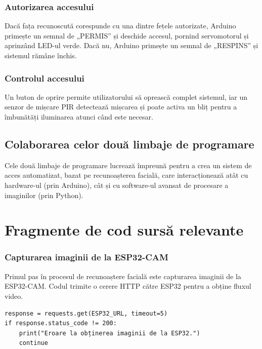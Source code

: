 \documentclass[a4paper,12pt]{report}
\begin{document}
\subsection{Autorizarea accesului}
Dacă fața recunoscută corespunde cu una dintre fețele autorizate, Arduino primește un semnal de „PERMIS” și deschide accesul, pornind servomotorul și aprinzând LED-ul verde. Dacă nu, Arduino primește un semnal de „RESPINS” și sistemul rămâne închis.

\subsection{Controlul accesului}
Un buton de oprire permite utilizatorului să oprească complet sistemul, iar un senzor de mișcare PIR detectează mișcarea și poate activa un bliț pentru a îmbunătăți iluminarea atunci când este necesar.

\section*{Colaborarea celor două limbaje de programare}

Cele două limbaje de programare lucrează împreună pentru a crea un sistem de acces automatizat, bazat pe recunoașterea facială, care interacționează atât cu hardware-ul (prin Arduino), cât și cu software-ul avansat de procesare a imaginilor (prin Python).


\chapter*{Fragmente de cod sursă relevante}

\subsection{Capturarea imaginii de la ESP32-CAM}
Primul pas în procesul de recunoaștere facială este capturarea imaginii de la ESP32-CAM. Codul trimite o cerere HTTP către ESP32 pentru a obține fluxul video.

\begin{lstlisting}[caption={Capturarea imaginii de la ESP32-CAM}]
response = requests.get(ESP32_URL, timeout=5)
if response.status_code != 200:
    print("Eroare la obținerea imaginii de la ESP32.")
    continue
\end{lstlisting}
\end{document}
